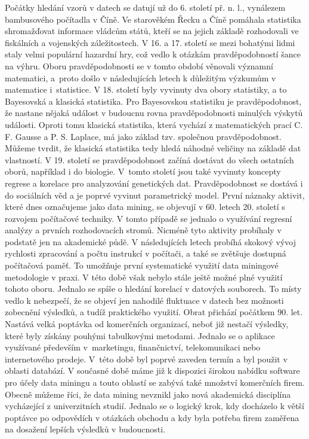 \documentclass[12pt]{article}
\begin{document}
Počátky hledání vzorů v datech se datují už do 6. století př. n. l., vynálezem bambusového počítadla v Číně. Ve starověkém   Řecku a Číně
pomáhala statistika shromažďovat informace vládcům států, kteří se na jejich základě rozhodovali ve fiskálních a vojenských záležitostech.
\newline
\indent
V 16. a 17. století se mezi bohatými lidmi staly velmi populární hazardní hry,
což vedlo k otázkám pravděpodobností šance na výhru. Oboru
pravděpodobnosti se v tomto období věnovali významní matematici, a~proto došlo
v následujících letech k důležitým výzkumům v matematice i~statistice.
V 18. století byly vyvinuty dva obory statistiky, a to Bayesovská a klasická
statistika. Pro Bayesovskou statistiku je pravděpodobnost, že nastane nějaká událost
v budoucnu rovna pravděpodobnosti minulých výskytů události. Oproti tomu
klasická statistika, která vychází z matematických prací C. F. Gausse a P. S. Laplace, má
jako základ tzv. společnou pravděpodobnost. Můžeme tvrdit, že klasická statistika tedy hledá náhodné veličiny na
základě dat vlastností.
V 19. století se pravděpodobnost začíná dostávat do všech ostatních oborů, například i do biologie.
V~tomto století jsou také vyvinuty koncepty regrese a korelace pro analyzování
genetických dat. Pravděpodobnost se dostává i do sociálních věd a je poprvé
vyvinut parametrický model.
\newline
\indent
První náznaky aktivit, které dnes označujeme jako data mining, se objevují v 60.
letech 20. století s rozvojem počítačové techniky. V tomto případě se jednalo
o využívání regresní analýzy a prvních rozhodovacích stromů. Nicméně tyto aktivity probíhaly v podstatě jen na akademické půdě. V následujících letech probíhá skokový vývoj rychlosti zpracování a počtu 
instrukcí v počítači, a také se zvětšuje dostupná počítačová paměť. To umožňuje první systematické využití data miningové metodologie v praxi. V této
době však nebylo stále ještě možné plné využití tohoto oboru. Jednalo se spíše
o hledání korelací v datových souborech. To místy vedlo k nebezpečí, že se objeví jen nahodilé fluktuace v datech bez možnosti zobecnění výsledků, a tudíž praktického využití.
\newline
\indent
Obrat přichází počátkem 90. let. Nastává velká poptávka od
komerčních organizací, neboť již nestačí výsledky, které byly získány pouhými
tabulkovými metodami. Jednalo se o aplikace využívané především v~marketingu,
finančnictví, telekomunikaci nebo internetového prodeje. V~této době byl
poprvé zaveden termín  a byl použit v oblasti databází. 
\newline
\indent
V současné době máme již k dispozici širokou nabídku software pro účely data miningu a touto
oblastí se zabývá také množství komerčních firem.
Obecně můžeme říci, že data mining nevznikl jako nová akademická disciplína vycházející z univerzitních studií. Jednalo se o logický krok, kdy docházelo k větší poptávce po
odpovědích v otázkách obchodu a kdy byla potřeba firem zaměřena na dosažení lepších výsledků v budoucnosti.
\end{document}
